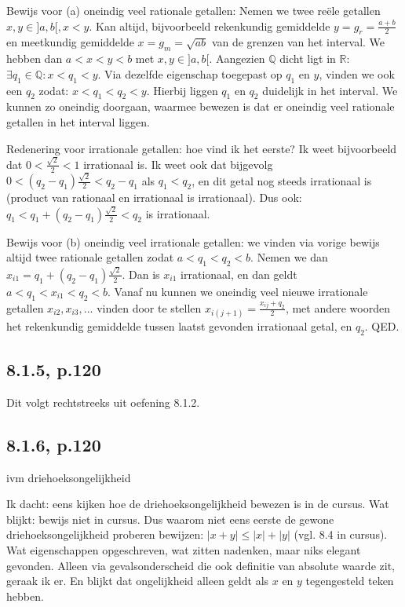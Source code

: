 \documentclass{article}
\begin{document}
Bewijs voor (a) oneindig veel rationale getallen: 
Nemen we twee re\"ele getallen $x,y \in ] a,b [, x<y$.  Kan altijd, bijvoorbeeld rekenkundig gemiddelde $y = g_r = \frac{a+b}{2}$ en meetkundig gemiddelde $x = g_m = \sqrt{a b} $ van de grenzen van het interval. We hebben dan $a < x < y <b$ met $x,y \in ] a,b [$. 
Aangezien  $\mathbb{Q}$ dicht ligt in $\mathbb{R}$: $\exists q_1 \in \mathbb{Q}: x < q_1 < y$. 
Via dezelfde eigenschap toegepast op $q_1$ en $y$, vinden we ook een $q_2$ zodat:  $x < q_1 < q_2 < y$. Hierbij liggen $q_1$ en $q_2$ duidelijk in het interval.
We kunnen zo oneindig doorgaan, waarmee bewezen is dat er oneindig veel rationale getallen in het interval liggen. 

Redenering voor irrationale getallen: hoe vind ik het eerste? Ik weet bijvoorbeeld dat $ 0< \frac{\sqrt{2}}{2} < 1$ irrationaal is. Ik weet ook dat bijgevolg $ 0 < (q_2-q_1)\frac{\sqrt{2}}{2}   < q_2 - q_1 $ als $q_1<q_2$, en dit getal nog steeds irrationaal is (product van rationaal en irrationaal is irrationaal). Dus ook: $ q_1  < q_1+ (q_2-q_1)\frac{\sqrt{2}}{2}   < q_2 $ is irrationaal. 

Bewijs voor (b) oneindig veel irrationale getallen: we vinden via vorige bewijs altijd twee rationale getallen zodat $a < q_1 < q_2 < b$. Nemen we dan $x_{i1} = q_1+ (q_2-q_1)\frac{\sqrt{2}}{2}$. Dan is $x_{i1}$ irrationaal, en dan geldt $a < q_1 < x_{i1} < q_2 < b$. Vanaf nu kunnen we oneindig veel nieuwe irrationale getallen $x_{i2}, x_{i3}, ... $ vinden door te stellen $x_{i(j+1)} = \frac{x_{ij}+q_2}{2} $, met andere woorden het rekenkundig gemiddelde tussen laatst gevonden irrationaal getal, en $q_2$. 
QED. 
 
\subsection{8.1.5, p.120}
Dit volgt rechtstreeks uit oefening 8.1.2. 

 
\subsection{8.1.6, p.120}
ivm driehoeksongelijkheid

Ik dacht: eens kijken hoe de driehoeksongelijkheid bewezen is in de cursus. Wat blijkt: bewijs niet in cursus. 
Dus waarom niet eens eerste de gewone driehoeksongelijkheid proberen bewijzen: $| x + y | \leq |x| + |y|$ (vgl. 8.4 in cursus). 
Wat eigenschappen opgeschreven, wat zitten nadenken, maar niks elegant gevonden. Alleen via gevalsonderscheid die ook definitie van absolute waarde zit, geraak ik er. En blijkt dat ongelijkheid alleen geldt als $x$ en $y$ tegengesteld teken hebben. 
\end{document}
